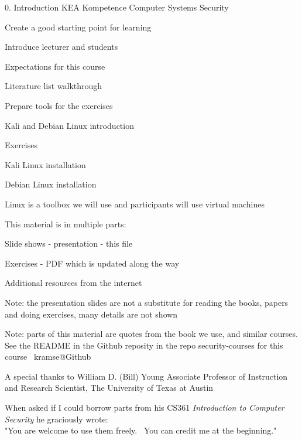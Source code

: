 \documentclass[Screen16to9,17pt]{foils}
\begin{document}
\mytitlepage
{0. Introduction}
{KEA Kompetence Computer Systems Security \the\year}

\hlkprofiluk


\begin{list2}
\item Create a good starting point for learning
\item Introduce lecturer and students
\item Expectations for this course
\item Literature list walkthrough
\item Prepare tools for the exercises
\item Kali and Debian Linux introduction
\end{list2}

Exercises
\begin{list2}
\item Kali Linux installation
\item Debian Linux installation
\end{list2}
Linux is a toolbox we will use and participants will use virtual machines


\begin{list1}
\item This material is in multiple parts:
\begin{list2}
\item Slide shows - presentation - this file
\item Exercises - PDF which is updated along the way
\end{list2}
\item Additional resources from the internet
\item Note: the presentation slides are not a substitute for reading the books, papers and doing exercises, many details are not shown
\end{list1}

Note: parts of this material are quotes from the book we use, and similar courses. See the README in the Github reposity  in the repo security-courses for this course \jobname\ kramse@Github

A special thanks to William D. (Bill) Young
Associate Professor of Instruction and Research Scientist,
The University of Texas at Austin

When asked if I could borrow parts from his CS361 \emph{Introduction to Computer Security} he graciously wrote:\\
"You are welcome to use them freely.  You can credit me at the beginning." 
\end{document}
